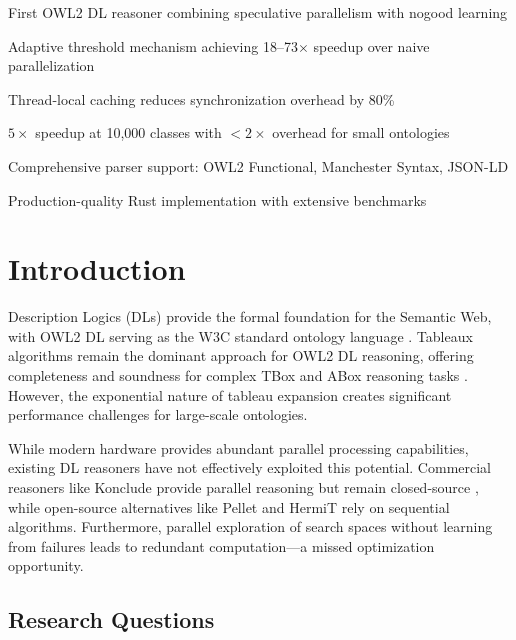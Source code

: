 \documentclass[preprint,12pt]{elsarticle}
\begin{document}
\begin{highlights}
\item First OWL2 DL reasoner combining speculative parallelism with nogood learning
\item Adaptive threshold mechanism achieving 18--73$\times$ speedup over naive parallelization
\item Thread-local caching reduces synchronization overhead by 80\%
\item $5\times$ speedup at 10,000 classes with $<2\times$ overhead for small ontologies
\item Comprehensive parser support: OWL2 Functional, Manchester Syntax, JSON-LD
\item Production-quality Rust implementation with extensive benchmarks
\end{highlights}


\section{Introduction}
\label{sec:intro}

Description Logics (DLs) provide the formal foundation for the Semantic Web, with OWL2 DL serving as the W3C standard ontology language \cite{owl2}. Tableaux algorithms remain the dominant approach for OWL2 DL reasoning, offering completeness and soundness for complex TBox and ABox reasoning tasks \cite{dlhandbook}. However, the exponential nature of tableau expansion creates significant performance challenges for large-scale ontologies.

While modern hardware provides abundant parallel processing capabilities, existing DL reasoners have not effectively exploited this potential. Commercial reasoners like Konclude provide parallel reasoning but remain closed-source \cite{konclude}, while open-source alternatives like Pellet \cite{pellet} and HermiT \cite{hermit} rely on sequential algorithms. Furthermore, parallel exploration of search spaces without learning from failures leads to redundant computation---a missed optimization opportunity.

\subsection{Research Questions}
\label{sec:questions}
\end{document}
